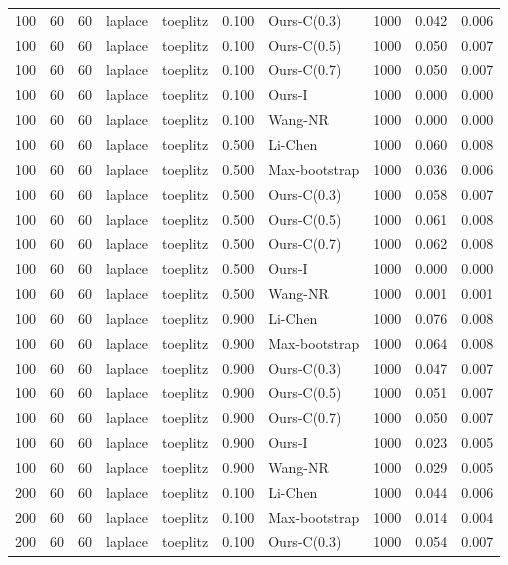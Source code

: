 \begin{tabular}{rrrllrlrrr}
100 & 60 & 60 & laplace & toeplitz & 0.100 & Ours-C(0.3) & 1000 & 0.042 & 0.006 \\
100 & 60 & 60 & laplace & toeplitz & 0.100 & Ours-C(0.5) & 1000 & 0.050 & 0.007 \\
100 & 60 & 60 & laplace & toeplitz & 0.100 & Ours-C(0.7) & 1000 & 0.050 & 0.007 \\
100 & 60 & 60 & laplace & toeplitz & 0.100 & Ours-I & 1000 & 0.000 & 0.000 \\
100 & 60 & 60 & laplace & toeplitz & 0.100 & Wang-NR & 1000 & 0.000 & 0.000 \\
100 & 60 & 60 & laplace & toeplitz & 0.500 & Li-Chen & 1000 & 0.060 & 0.008 \\
100 & 60 & 60 & laplace & toeplitz & 0.500 & Max-bootstrap & 1000 & 0.036 & 0.006 \\
100 & 60 & 60 & laplace & toeplitz & 0.500 & Ours-C(0.3) & 1000 & 0.058 & 0.007 \\
100 & 60 & 60 & laplace & toeplitz & 0.500 & Ours-C(0.5) & 1000 & 0.061 & 0.008 \\
100 & 60 & 60 & laplace & toeplitz & 0.500 & Ours-C(0.7) & 1000 & 0.062 & 0.008 \\
100 & 60 & 60 & laplace & toeplitz & 0.500 & Ours-I & 1000 & 0.000 & 0.000 \\
100 & 60 & 60 & laplace & toeplitz & 0.500 & Wang-NR & 1000 & 0.001 & 0.001 \\
100 & 60 & 60 & laplace & toeplitz & 0.900 & Li-Chen & 1000 & 0.076 & 0.008 \\
100 & 60 & 60 & laplace & toeplitz & 0.900 & Max-bootstrap & 1000 & 0.064 & 0.008 \\
100 & 60 & 60 & laplace & toeplitz & 0.900 & Ours-C(0.3) & 1000 & 0.047 & 0.007 \\
100 & 60 & 60 & laplace & toeplitz & 0.900 & Ours-C(0.5) & 1000 & 0.051 & 0.007 \\
100 & 60 & 60 & laplace & toeplitz & 0.900 & Ours-C(0.7) & 1000 & 0.050 & 0.007 \\
100 & 60 & 60 & laplace & toeplitz & 0.900 & Ours-I & 1000 & 0.023 & 0.005 \\
100 & 60 & 60 & laplace & toeplitz & 0.900 & Wang-NR & 1000 & 0.029 & 0.005 \\
200 & 60 & 60 & laplace & toeplitz & 0.100 & Li-Chen & 1000 & 0.044 & 0.006 \\
200 & 60 & 60 & laplace & toeplitz & 0.100 & Max-bootstrap & 1000 & 0.014 & 0.004 \\
200 & 60 & 60 & laplace & toeplitz & 0.100 & Ours-C(0.3) & 1000 & 0.054 & 0.007 \\

\end{tabular}
